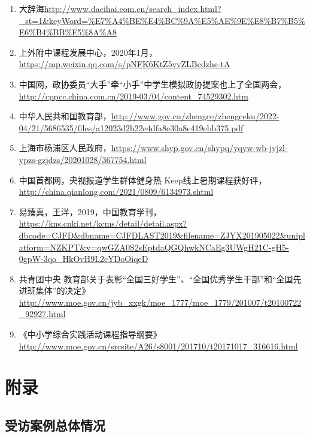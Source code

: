 \documentclass[12pt,UTF8]{ctexart}
\begin{document}
\begin{enumerate}[1.]
	\item 大辞海\url{http://www.dacihai.com.cn/search_index.html?_st=1&keyWord=\%E7\%A4\%BE\%E4\%BC\%9A\%E5\%AE\%9E\%E8\%B7\%B5\%E6\%B4\%BB\%E5\%8A\%A8}
	\item 上外附中课程发展中心，2020年1月，\url{https://mp.weixin.qq.com/s/pNFK6KtZ5vvZLBedzhe-tA}
	\item 中国网，政协委员“大手”牵“小手”中学生模拟政协提案也上了全国两会，\url{http://cppcc.china.com.cn/2019-03/04/content_74529302.htm}
	\item 中华人民共和国教育部，\url{http://www.gov.cn/zhengce/zhengceku/2022-04/21/5686535/files/a12023d2b22e4dfa8e30a8e419ebb375.pdf}
	\item 上海市杨浦区人民政府，\url{https://www.shyp.gov.cn/shypq/yqyw-wb-jyjzl-ypzs-gzjdzs/20201028/367754.html}
	\item 中国首都网，央视报道学生群体健身热 Keep线上暑期课程获好评，\url{http://china.qianlong.com/2021/0809/6134973.shtml}
	\item 易臻真，王洋，2019，中国教育学刊，\url{https://kns.cnki.net/kcms/detail/detail.aspx?dbcode=CJFD&dbname=CJFDLAST2019&filename=ZJYX201905022&uniplatform=NZKPT&v=qwGZA0S2sEptdaQGQhwkNCaEg3UWgH21C-gH5-0gpW-3qo_HkOvH9L2cYDoOiqeD}
	\item 共青团中央 教育部关于表彰“全国三好学生”、“全国优秀学生干部”和“全国先进班集体”的决定》\url{http://www.moe.gov.cn/jyb_xxgk/moe_1777/moe_1779/201007/t20100722_92927.html}
	\item 《中小学综合实践活动课程指导纲要》\url{http://www.moe.gov.cn/srcsite/A26/s8001/201710/t20171017_316616.html}
\end{enumerate}



\newpage
\section {附录}

\subsection{受访案例总体情况}
\end{document}
